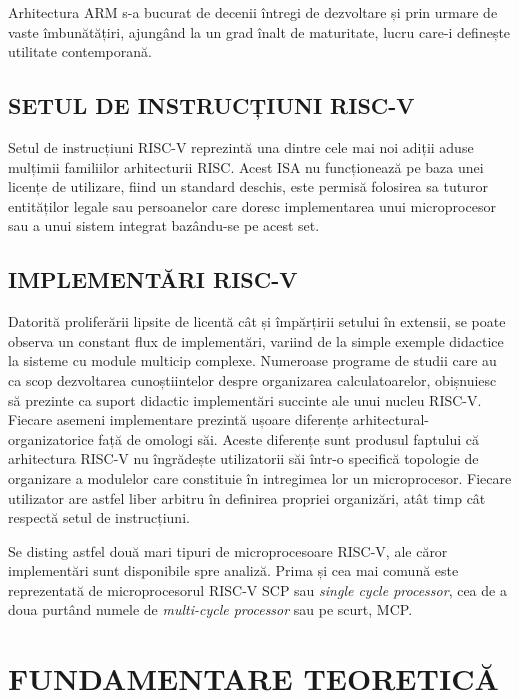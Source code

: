 \documentclass[12pt]{article}
\begin{document}
Arhitectura ARM s-a bucurat de decenii întregi de dezvoltare și prin urmare de vaste îmbunătățiri, ajungând la un grad înalt de maturitate, lucru care-i definește utilitate contemporană.

\subsection{SETUL DE INSTRUCȚIUNI RISC-V}
Setul de instrucțiuni RISC-V reprezintă una dintre cele mai noi adiții aduse mulțimii familiilor arhitecturii RISC. Acest ISA nu funcționează pe baza unei licențe de utilizare, fiind un standard deschis, este permisă folosirea sa tuturor entităților legale sau persoanelor care doresc implementarea unui microprocesor sau a unui sistem integrat bazându-se pe acest set.

\subsection{IMPLEMENTĂRI  RISC-V}
Datorită proliferării lipsite de licentă cât și împărțirii setului în extensii, se poate observa un constant flux de implementări, variind de la simple exemple didactice la sisteme cu module multicip complexe. Numeroase programe de studii care au ca scop dezvoltarea cunoștiintelor despre organizarea calculatoarelor, obișnuiesc să prezinte ca suport didactic implementări succinte ale unui nucleu RISC-V. Fiecare asemeni implementare prezintă ușoare diferențe arhitectural-organizatorice față de omologi săi. Aceste diferențe sunt produsul faptului că arhitectura RISC-V nu îngrădește utilizatorii săi într-o specifică topologie de organizare a modulelor care constituie în intregimea lor un microprocesor. Fiecare utilizator are astfel liber arbitru în definirea propriei organizări, atât timp cât respectă setul de instrucțiuni.

Se disting astfel două mari tipuri de microprocesoare RISC-V, ale căror implementări sunt disponibile spre analiză. Prima și cea mai comună este reprezentată de microprocesorul RISC-V SCP sau \textit{single cycle processor}, cea de a doua purtând numele de \textit{multi-cycle processor} sau pe scurt, MCP.

\newpage
\section{\centering FUNDAMENTARE TEORETICĂ}
\end{document}
